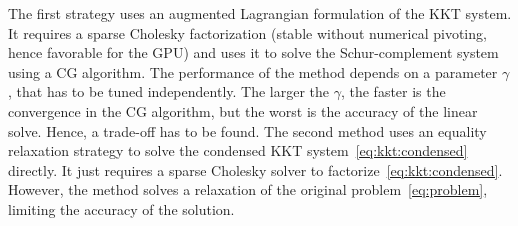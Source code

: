 The first strategy uses an augmented Lagrangian formulation
of the KKT system. It requires a sparse Cholesky factorization (stable without numerical
pivoting, hence favorable for the GPU) and uses it to solve the Schur-complement system
using a CG algorithm. The performance of the method depends on a parameter $\gamma$, that
has to be tuned independently. The larger the $\gamma$, the faster is the convergence
in the CG algorithm, but the worst is the accuracy of the linear solve. Hence, a trade-off
has to be found. The second method uses an equality relaxation strategy to
solve the condensed KKT system~\eqref{eq:kkt:condensed} directly. It just requires
a sparse Cholesky solver to factorize~\eqref{eq:kkt:condensed}. However, the method
solves a relaxation of the original problem~\eqref{eq:problem}, limiting the accuracy
of the solution.

